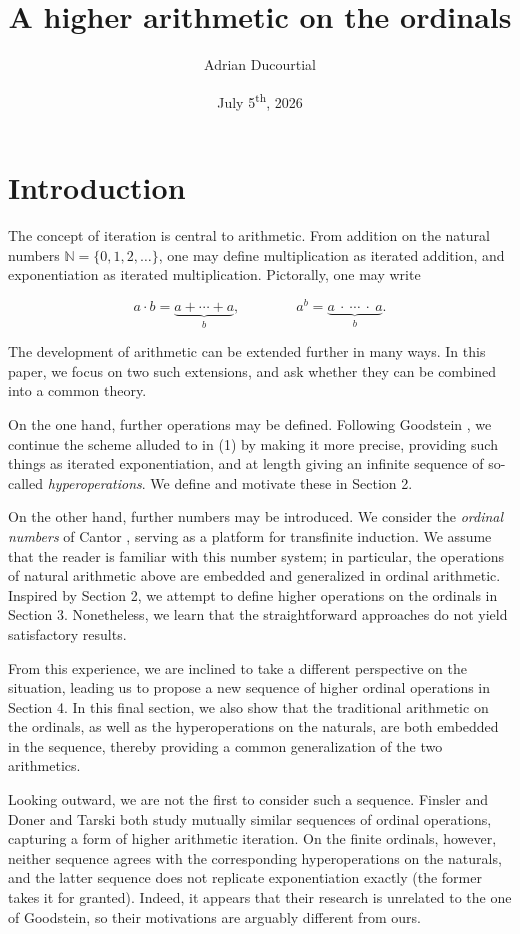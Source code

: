 \documentclass[12pt, a4paper]{article}
\title{A higher arithmetic on the ordinals}
\author{Adrian Ducourtial}
\date{July 5\textsuperscript{th}, 2026}
\theoremstyle{definition}
\theoremstyle{remark}
\newcommand{\N}{\mathbb N}
\begin{document}
\maketitle

\section{Introduction}

The concept of iteration is central to arithmetic. From addition on the natural numbers $\N = \{0, 1, 2, \dots\}$, one may define multiplication as iterated addition, and exponentiation as iterated multiplication. Pictorally, one may write

\begin{equation}
    a \cdot b = \underbrace{a+\cdots+a}_{b}, \qquad\qquad a^b = \underbrace{a\ \cdot\ \cdots\ \cdot\ a}_{b}.
\end{equation}

The development of arithmetic can be extended further in many ways. In this paper, we focus on two such extensions, and ask whether they can be combined into a common theory.

On the one hand, further operations may be defined. Following Goodstein \cite{Goo1947}, we continue the scheme alluded to in (1) by making it more precise, providing such things as iterated exponentiation, and at length giving an infinite sequence of so-called \emph{hyperoperations}. We define and motivate these in Section 2.

On the other hand, further numbers may be introduced. We consider the \emph{ordinal numbers} of Cantor \cite{Can1883}, serving as a platform for transfinite induction. We assume that the reader is familiar with this number system; in particular, the operations of natural arithmetic above are embedded and generalized in ordinal arithmetic. Inspired by Section 2, we attempt to define higher operations on the ordinals in Section 3. Nonetheless, we learn that the straightforward approaches do not yield satisfactory results.

From this experience, we are inclined to take a different perspective on the situation, leading us to propose a new sequence of higher ordinal operations in Section 4. In this final section, we also show that the traditional arithmetic on the ordinals, as well as the hyperoperations on the naturals, are both embedded in the sequence, thereby providing a common generalization of the two arithmetics.

Looking outward, we are not the first to consider such a sequence. Finsler \cite{Fin1951} and Doner and Tarski \cite{DoTa1969} both study mutually similar sequences of ordinal operations, capturing a form of higher arithmetic iteration. On the finite ordinals, however, neither sequence agrees with the corresponding hyperoperations on the naturals, and the latter sequence does not replicate exponentiation exactly (the former takes it for granted). Indeed, it appears that their research is unrelated to the one of Goodstein, so their motivations are arguably different from ours.
\end{document}
